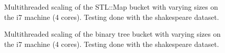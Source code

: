 \begin{landscape}
\begin{figure}[H]
{    }
    \label{fig:ts_i7_shake_map}
    \caption{Multithreaded scaling of the STL::Map bucket with varying sizes on the
    i7 machine (4 cores). Testing done with the shakespeare dataset.}
\end{figure}
\begin{figure}[H]
    \label{fig:ts_i7_shake_btree}
    \caption{Multithreaded scaling of the binary tree bucket with varying sizes on the
    i7 machine (4 cores). Testing done with the shakespeare dataset.}
\end{figure}
\end{landscape}
